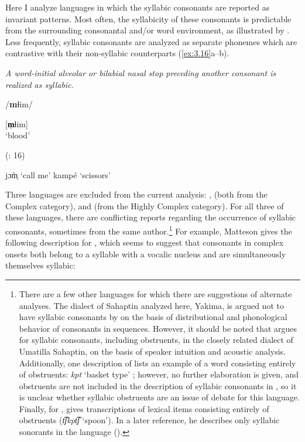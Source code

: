   Here I analyze languages in which the syllabic consonants are reported as invariant patterns. Most often, the syllabicity of these consonants is predictable from the surrounding consonantal and/or word environment, as illustrated by . Less frequently, syllabic consonants are analyzed as separate phonemes which are contrastive with their non-syllabic counterparts (\ref{ex:3.16}a--b).

\ea\label{ex:3.15}

\textit{A word-initial alveolar or bilabial nasal stop preceding another consonant is realized as syllabic.}

/\textbf{m}ɬim/

[\textbf{m̩}ɬim]\\
\glt ‘blood’

(\citealt{GeorgVolodin1999}: 16)
\z

\ea\label{ex:3.16}
\ea   jɔm̩̀
\glt  ‘call me’
\ex kampé
\glt  ‘scissors’
\citep[38]{Ameka1991}
\z
\z

  Three languages are excluded from the current analysis: ,  (both from the Complex category), and  (from the Highly Complex category). For all three of these languages, there are conflicting reports regarding the occurrence of syllabic consonants, sometimes from the same author.\footnote{{There are a few other languages for which there are suggestions of alternate analyses. The dialect of Sahaptin analyzed here, Yakima, is argued not to have syllabic consonants by \citet{HargusBeavert2006} on the basis of distributional and phonological behavior of consonants in sequences. However, it should be noted that \citet{Minthorn2005} argues for syllabic consonants, including obstruents, in the closely related dialect of Umatilla Sahaptin, on the basis of speaker intuition and acoustic analysis. Additionally, one description of  lists an example of a word consisting entirely of obstruents:} \textrm{\textit{kpt}} \textrm{‘basket type’ \citep[1]{EdmistonEdmiston2003}; however, no further elaboration is given, and obstruents are not included in the description of syllabic consonants in \citet{Bruce1984}, so it is unclear whether syllabic obstruents are an issue of debate for this language. Finally, for , \citet[42]{Volodin1976} gives transcriptions of lexical items consisting entirely of obstruents (}\textrm{\textit{t͡ʃkpt͡ʃ} }\textrm{‘spoon’). In a later reference, he describes only syllabic sonorants in the language (\citealt{GeorgVolodin1999}).}} For example, Matteson gives the following description for , which seems to suggest that consonants in complex onsets both belong to a syllable with a vocalic nucleus and are simultaneously themselves syllabic:

